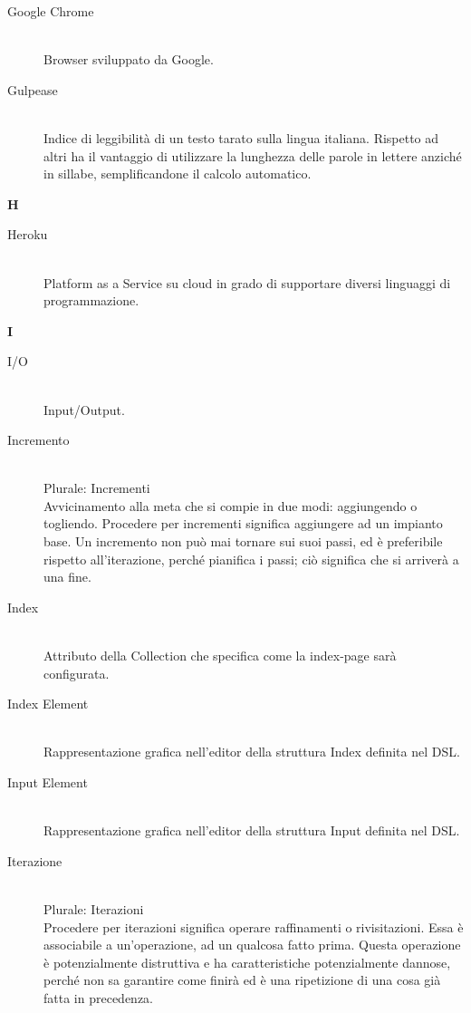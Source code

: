 \begin{description}\item[Google Chrome] \hfill \\
Browser sviluppato da Google.
 \item[Gulpease] \hfill \\
Indice di leggibilità di un testo tarato sulla lingua italiana. Rispetto ad altri ha il vantaggio di utilizzare la lunghezza delle parole in lettere anziché in sillabe, semplificandone il calcolo automatico.
 \end{description}
\newpage 
\begin{center}\textbf{\Huge{H}}\end{center}
\begin{description}\item[Heroku] \hfill \\
Platform as a Service su cloud in grado di supportare diversi linguaggi di programmazione.
 \end{description}
\newpage 
\begin{center}\textbf{\Huge{I}}\end{center}
\begin{description}\item[I/O] \hfill \\
Input/Output.
 \item[Incremento] \hfill \\
Plurale: Incrementi\\ 
Avvicinamento alla meta che si compie in due modi:
		aggiungendo	o togliendo. Procedere per incrementi significa aggiungere ad un impianto base. Un incremento non può mai tornare sui suoi passi, ed è preferibile rispetto all'iterazione, perché pianifica i passi; ciò significa che si arriverà a una fine.
 \item[Index] \hfill \\
Attributo della Collection che specifica come la index-page	sarà configurata.
 \item[Index Element] \hfill \\
Rappresentazione grafica nell'editor della struttura Index definita nel DSL.
 \item[Input Element] \hfill \\
Rappresentazione grafica nell'editor della struttura Input definita nel DSL.
 \item[Iterazione] \hfill \\
Plurale: Iterazioni\\ 
Procedere per iterazioni significa operare raffinamenti o
		rivisitazioni. Essa è associabile a un'operazione, ad un qualcosa
		fatto prima. Questa operazione è potenzialmente distruttiva e ha
		caratteristiche potenzialmente dannose, perché non sa garantire come finirà ed è una ripetizione di una cosa già fatta in precedenza.
 \end{description}
